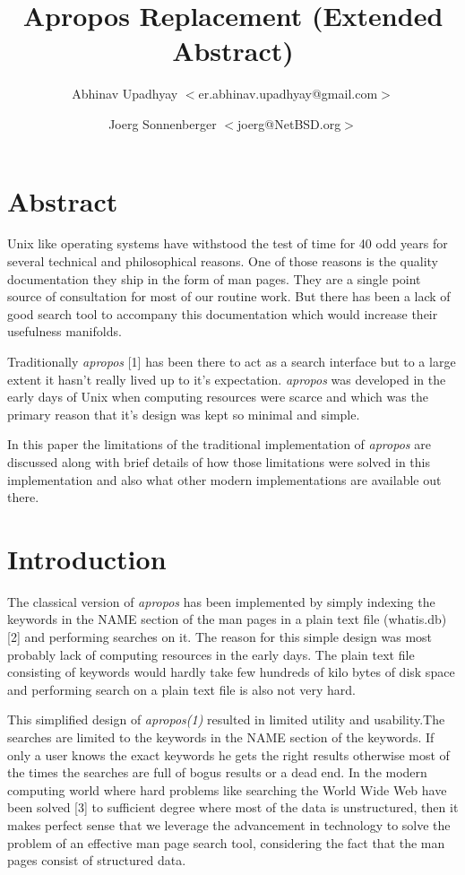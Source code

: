 \documentclass[titlepage, a4paper, 12pt]{article}
\title{Apropos Replacement \newline
(Extended  Abstract)}
\author{Abhinav Upadhyay $<$er.abhinav.upadhyay@gmail.com$>$ \and 
Joerg Sonnenberger $<$joerg@NetBSD.org$>$}
\begin{document}
\maketitle
\section{Abstract}
Unix like operating systems have withstood the test of time for 40 odd years for
several technical and philosophical reasons. One of those reasons is the
quality documentation they ship in the form of man pages. They are a single point
source of consultation for most of our routine work. But there has been a lack of
good search tool to accompany this documentation which would increase their
usefulness manifolds.

Traditionally \textit{apropos} [1] has been there to act as a search
interface but to a large extent it hasn't really lived up to it's expectation.
\textit{apropos} was
developed in the early days of Unix when computing resources were scarce and
which was the primary reason that it's design was kept so
minimal and simple.

In this paper the limitations of the traditional implementation of
\textit{apropos} are discussed along with brief details of how those limitations
were solved in this implementation and also what other modern implementations
are available out there.
\section{Introduction}
The classical version of \textit{apropos} has been implemented by simply
indexing the keywords in the NAME section of the man pages in a plain text file
(whatis.db) [2]
and performing searches on it. The reason for this simple design was most
probably lack of computing resources in the early days. The plain text file
consisting of keywords would hardly take few hundreds of kilo bytes of disk space
and performing search on a plain text file is also not very hard.

This simplified design of \textit{apropos(1)} resulted in limited utility and
usability.The searches are limited to the keywords in the NAME section of the
 keywords. If
only a user knows the exact keywords he gets the right results otherwise most of
the times the searches are full of bogus results or a dead end. In the modern
computing world where hard problems like searching the World Wide Web have been
solved [3] to sufficient degree where most of the data is unstructured, then it
makes perfect sense that we leverage the advancement in technology to solve the
problem of an effective man page search tool, considering the fact that the man
pages consist of structured data.
\end{document}

